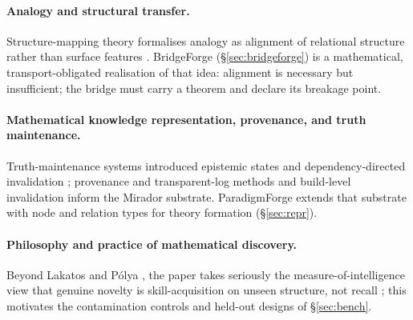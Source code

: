 \documentclass[11pt]{article}
\theoremstyle{definition}
\theoremstyle{remark}
\newcommand{\PF}{ParadigmForge}
\begin{document}
\paragraph{Analogy and structural transfer.}
Structure-mapping theory formalises analogy as alignment of relational structure rather than surface
features \citep{gentner1983}. BridgeForge (\S\ref{sec:bridgeforge}) is a mathematical,
transport-obligated realisation of that idea: alignment is necessary but insufficient; the bridge
must carry a theorem and declare its breakage point.

\paragraph{Mathematical knowledge representation, provenance, and truth maintenance.}
Truth-maintenance systems introduced epistemic states and dependency-directed invalidation
\citep{doyle1979tms,dekleer1986atms}; provenance and transparent-log methods
\citep{kuhn2016nanopub,moreau2013prov,laurie2013ct} and build-level invalidation \citep{celik2017icoq}
inform the Mirador substrate. \PF{} extends that substrate with node and relation types for
theory formation (\S\ref{sec:repr}).

\paragraph{Philosophy and practice of mathematical discovery.}
Beyond Lakatos \citep{lakatos1976} and P\'olya \citep{polya1945}, the paper takes seriously the
measure-of-intelligence view that genuine novelty is skill-acquisition on unseen structure, not
recall \citep{chollet2019}; this motivates the contamination controls and held-out designs of
\S\ref{sec:bench}.
\end{document}
